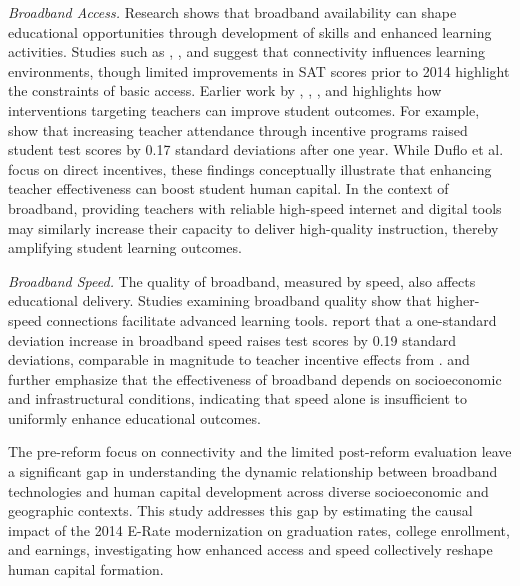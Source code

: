\textit{Broadband Access.}  Research shows that broadband availability can shape educational opportunities through development of skills and enhanced learning activities. Studies such as \citet{hazlett2019}, \citet{dettling2015}, and \citet{niewoehner2025} suggest that connectivity influences learning environments, though limited improvements in SAT scores prior to 2014 \citep{hazlett2019} highlight the constraints of basic access. Earlier work by \citet{angrist2002}, \citet{angrist2009}, \citet{beuermann2013}, and \citet{duflo2012} highlights how interventions targeting teachers can improve student outcomes. For example, \citet{duflo2012} show that increasing teacher attendance through incentive programs raised student test scores by 0.17 standard deviations after one year. While Duflo et al. focus on direct incentives, these findings conceptually illustrate that enhancing teacher effectiveness can boost student human capital. In the context of broadband, providing teachers with reliable high-speed internet and digital tools may similarly increase their capacity to deliver high-quality instruction, thereby amplifying student learning outcomes.

\textit{Broadband Speed.} The quality of broadband, measured by speed, also affects educational delivery. Studies examining broadband quality show that higher-speed connections facilitate advanced learning tools. \citet{sanchis2021} report that a one-standard deviation increase in broadband speed raises test scores by 0.19 standard deviations, comparable in magnitude to teacher incentive effects from \citet{duflo2012}. \citet{boeri2023} and \citet{grimes2018} further emphasize that the effectiveness of broadband depends on socioeconomic and infrastructural conditions, indicating that speed alone is insufficient to uniformly enhance educational outcomes.

The pre-reform focus on connectivity \citep{hazlett2019} and the limited post-reform evaluation leave a significant gap in understanding the dynamic relationship between broadband technologies and human capital development across diverse socioeconomic and geographic contexts. This study addresses this gap by estimating the causal impact of the 2014 E-Rate modernization on graduation rates, college enrollment, and earnings, investigating how enhanced access and speed collectively reshape human capital formation. 


